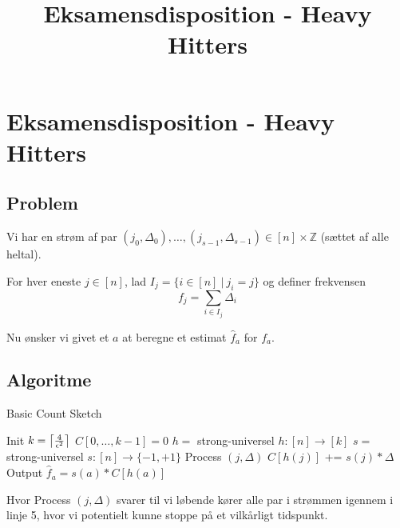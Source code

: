 
\title{Eksamensdisposition - Heavy Hitters}


\maketitle



\newpage
\section{Eksamensdisposition - Heavy Hitters}

\subsection{Problem}

Vi har en strøm af par $(j_0, \Delta_0), \dots, (j_{s-1}, \Delta_{s-1}) \in [n]\times \mathbb Z$ (sættet af alle heltal).

For hver eneste $j \in [n]$, lad $I_j = \{ i \in [n] \ | \ j_i = j \}$ og definer frekvensen
$$
f_j = \sum_{i \in I_j} \Delta_i
$$

Nu ønsker vi givet et $a$ at beregne et estimat $\hat f_a$ for $f_a$.

\subsection{Algoritme}

\begin{algorithm}[H] \caption{Basic Count Sketch} \label{alg:bcs}
  \nonl Init\;
  $k = \left\lceil \frac{4}{\epsilon^2} \right\rceil$\;
  $C[0, \dots, k-1] = 0$\;
  $h =$ strong-universel $h : [n] \rightarrow [k]$\;
  $s =$ strong-universel $s : [n] \rightarrow \{-1, +1 \}$\;
  \nonl Process $(j, \Delta)$\;
  $C[h(j)]$ += $s(j) * \Delta$\;
  \nonl Output\;
  \Return $\hat f_a = s(a) * C[h(a)]$
\end{algorithm}\vspace{1em}

Hvor Process $(j, \Delta)$ svarer til vi løbende kører alle par i strømmen igennem i linje 5, hvor vi potentielt kunne stoppe på et vilkårligt tidspunkt.\\

